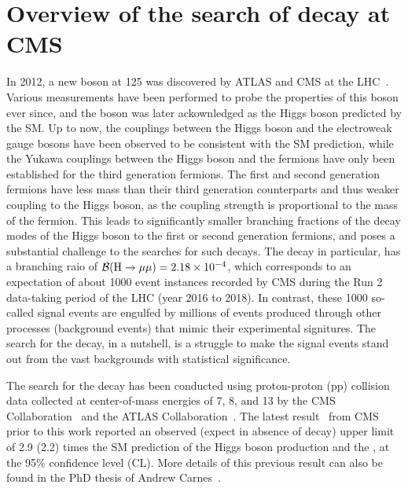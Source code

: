 \chapter{Overview of the search of \texorpdfstring{\hmm}{H to muons} decay at CMS}\label{chp:hmm_overview}

In 2012, a new boson at 125 \GeV was discovered by ATLAS and CMS at the LHC~\cite{Aad:2012tfa, Chatrchyan:2012xdj, Chatrchyan:2013lba}. 
Various measurements have been performed to probe the properties of this boson ever since, 
and the boson was later ackownledged as the Higgs boson predicted by the SM.
Up to now, the couplings between the Higgs boson and the electroweak gauge bosons have been observed to be consistent with the SM prediction, 
while the Yukawa couplings between the Higgs boson and the fermions have only been established for the third generation fermions. 
The first and second generation fermions have less mass than their third generation counterparts and thus weaker coupling to the Higgs boson, 
as the coupling strength is proportional to the mass of the fermion.
This leads to significantly smaller branching fractions of the decay modes of the Higgs boson to the first or second generation fermions, 
and poses a substantial challenge to the searches for such decays.  
The \hmm decay in particular, has a branching raio of ${{\mathcal{B}(\mathrm{H} \to \mu\mu)} = 2.18 \times 10^{-4}}$, 
which corresponds to an expectation of about 1000 event instances recorded by CMS during the Run 2 data-taking period of the LHC (year 2016 to 2018).
In contrast, these 1000 so-called signal events are engulfed by millions of events produced through other processes (background events) that mimic their experimental signitures.
The search for the \hmm decay, in a nutshell, is a struggle to make the signal events stand out from the vast backgrounds with statistical significance.

The search for the \hmm decay has been conducted using proton-proton (pp) collision data collected at center-of-mass energies of 7, 8, and 13 \TeV
by the CMS Collaboration~\cite{2015184, PhysRevLett.122.021801} and the ATLAS Collaboration~\cite{201468, PhysRevLett.119.051802, Aad:2020xfq}.
The latest result~\cite{PhysRevLett.122.021801} from CMS prior to this work reported an observed (expect in absence of \hmm decay) upper limit of 2.9 (2.2) times the 
SM prediction of the Higgs boson production and the \brhmm, at the 95\% confidence level (CL).
More details of this previous result can also be found in the PhD thesis of Andrew Carnes~\cite{carnesthesis}.  

